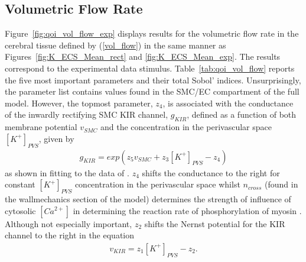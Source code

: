 \subsection{Volumetric Flow Rate}
Figure~\ref{fig:qoi_vol_flow_exp} displays results for the volumetric flow rate in the cerebral tissue defined by (\ref{vol_flow})  in the same manner as Figures~\ref{fig:K_ECS_Mean_rect} and \ref{fig:K_ECS_Mean_exp}. The results correspond to the experimental data stimulus.  Table~\ref{tab:qoi_vol_flow} reports the five most important parameters and their total Sobol' indices. Unsurprisingly, the parameter list contains values found in the SMC/EC compartment of the full model. However, the topmost parameter, $z_4$, is associated with the conductance of the inwardly rectifying SMC KIR channel, $g_{KIR}$, defined as a function of both membrane potential $v_{SMC}$ and the \pot concentration in the perivascular space $[K^+]_{PVS}$, given by 
\begin{eqnarray}
g_{KIR}=exp\left( z_5 v_{SMC}+z_3[K^+]_{PVS}-z_4\right)  \label{eqn:gkir}
\end{eqnarray}
as shown in \cite{Dormanns2015} fitting to the data of \cite{Filosa2006}. $z_4$ shifts the conductance to the right for constant $[K^+]_{PVS}$  concentration in the perivascular space whilst $n_{cross}$ (found in the wallmechanics section of the model) determines the strength of influence of cytosolic $[Ca^{2+}]$ in determining the reaction rate of phosphorylation of myosin \cite{Hai1988}. Although not especially important, $z_2$ shifts the Nernst potential for the KIR channel to the right in the equation
\begin{eqnarray}
v_{KIR}=z_1 [K^+]_{PVS}-z_2. \label{vkir}
\end{eqnarray}

